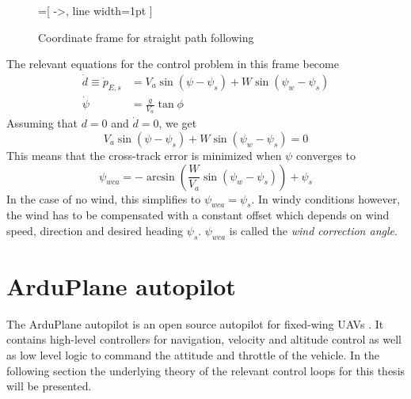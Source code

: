 \begin{figure}[H]
    \begin{center}
        =[
            ->,
            line width=1pt
            ]
    \end{center}
    \caption{Coordinate frame for straight path following}
    \label{fig:coord_straight}
\end{figure}

The relevant equations for the control problem in this frame become
\begin{align}
    \dot{d}\equiv\dot{p}_{E,s} &= V_a\sin(\psi-\psi_s) + W\sin(\psi_w-\psi_s)\\
    \dot{\psi} &= \frac{g}{V_a}\tan\phi
\end{align}
Assuming that $d=0$ and $\dot{d}=0$, we get
\begin{equation}
    V_a\sin(\psi-\psi_s) + W\sin(\psi_w-\psi_s)=0
\end{equation}
This means that the cross-track error is minimized when $\psi$ converges to
\begin{equation}\label{eq:wca}
    \psi_{wca}=-\arcsin\left(\frac{W}{V_a}\sin(\psi_w-\psi_s)\right) + \psi_s
\end{equation}
In the case of no wind, this simplifies to $\psi_{wca}=\psi_s$. In windy conditions however, the wind 
has to be compensated with a constant offset which depends on wind speed, direction and desired 
heading $\psi_s$. $\psi_{wca}$ is called the \textit{wind correction angle}.

\section{ArduPlane autopilot}
The ArduPlane autopilot is an open source autopilot for fixed-wing UAVs \cite{arduplane}. 
It contains high-level controllers for navigation, velocity and altitude control as well as 
low level logic to command the attitude and throttle of the vehicle. In the following section
the underlying theory of the relevant control loops for this thesis will be presented.


